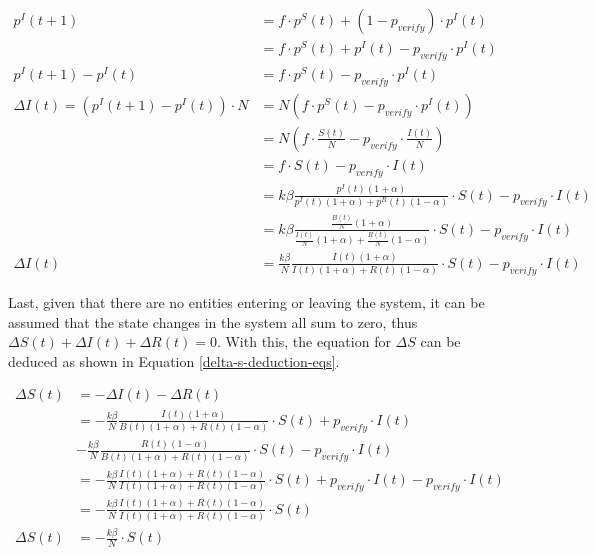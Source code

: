 \begin{align}
    p^I(t+1) &= f \cdot p^S(t) + (1 - p_{verify})\cdot p^I(t) \nonumber\\
     &= f \cdot p^S(t) + p^I(t) - p_{verify}\cdot p^I(t) \nonumber\\
    p^I(t+1) - p^I(t) &= f \cdot p^S(t) - p_{verify}\cdot p^I(t) \nonumber\\
    \Delta I(t) = (p^I(t+1) - p^I(t)) \cdot N 
    &= N (f \cdot p^S(t) - p_{verify}\cdot p^I(t)) \nonumber\\
    &= N (f \cdot \frac{S(t)}{N}  - p_{verify}\cdot \frac{I(t)}{N}) \nonumber\\
    &= f \cdot S(t) - p_{verify}\cdot I(t) \nonumber\\
    &=  k\beta \frac{p^I(t)(1+\alpha)}{p^I(t)(1+\alpha)+p^R(t)(1-\alpha)}
     \cdot S(t) - p_{verify}\cdot I(t) \nonumber\\
    &=  k\beta \frac{\frac{B(t)}{N}(1+\alpha)}{\frac{I(t)}{N}(1+\alpha)+\frac{R(t)}{N}(1-\alpha)}
     \cdot S(t) - p_{verify}\cdot I(t) \nonumber\\
     \Delta I(t) &=  \frac{k\beta}{N} \frac{I(t)(1+\alpha)}{I(t)(1+\alpha)+R(t)(1-\alpha)}
     \cdot S(t) - p_{verify}\cdot I(t) \label{delta-i-deduction-eqs}
\end{align}

Last, given that there are no entities entering or leaving the system,
it can be assumed that the state changes in the system all sum to zero,
thus $\Delta S(t)+ \Delta I(t)+ \Delta R(t) = 0$. With this, the equation for
$\Delta S$ can be deduced as shown in Equation \ref{delta-s-deduction-eqs}.

\begin{align}
    \Delta S(t) &= - \Delta I(t) - \Delta R(t) \nonumber\\
     &= -\frac{k\beta}{N} \frac{I(t)(1+\alpha)}{B(t)(1+\alpha)+R(t)(1-\alpha)}
     \cdot S(t) + p_{verify}\cdot I(t) \nonumber\\
      & -\frac{k\beta}{N} \frac{R(t)(1-\alpha)}{B(t)(1+\alpha)+R(t)(1-\alpha)} 
      \cdot S(t) - p_{verify}\cdot I(t) \nonumber\\
      &= -\frac{k\beta}{N} \frac{I(t)(1+\alpha) + R(t)(1-\alpha)}{I(t)(1+\alpha)+R(t)(1-\alpha)}
      \cdot S(t) + p_{verify}\cdot I(t) - p_{verify}\cdot I(t) \nonumber\\
      &= -\frac{k\beta}{N} \frac{I(t)(1+\alpha) + R(t)(1-\alpha)}{I(t)(1+\alpha)+R(t)(1-\alpha)}
      \cdot S(t) \nonumber\\
      \Delta S(t) &= -\frac{k\beta}{N} \cdot S(t) \label{delta-s-deduction-eqs}
\end{align}


